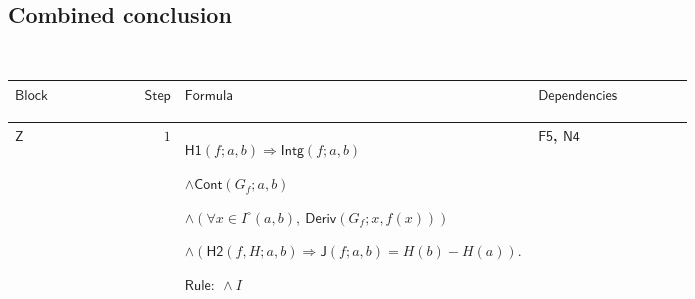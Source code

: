 \documentclass[12pt,reqno]{amsart}
\theoremstyle{blueplain}
\numberwithin{equation}{section}
\newlength{\FTCOneColumnBody}
\begin{document}
{\scriptsize \ }

\subsection{\protect\scriptsize Combined conclusion}

{\scriptsize {\ }}

{\scriptsize \setlength{\parskip}{0pt}\nointerlineskip
\noindent 
\begin{tabular}{|@{}>{\centering\arraybackslash}m{\FTCOneColumnBody}|}
\hline
$\displaystyle \mathsf{Conclusion}$ \\ \hline
\end{tabular}%
}

{\scriptsize \setlength{\parskip}{0pt}\nointerlineskip
\noindent 
\begin{tabular}{|@{}>{\centering\arraybackslash}m{0.10658\linewidth}|>{\centering\arraybackslash}m{0.03553\linewidth}|>{\centering\arraybackslash}m{0.52105\linewidth}|>{\centering\arraybackslash}m{0.23684\linewidth}|}
\hline
$\displaystyle \mathsf{Block}$ & $\displaystyle \mathsf{Step}$ & $%
\displaystyle \mathsf{Formula}$ & $\displaystyle \mathsf{Dependencies}$ \\ 
\hline
\end{tabular}%
}

{\scriptsize \setlength{\parskip}{0pt}\nointerlineskip
\noindent 
\begin{tabular}{|@{}>{\centering\arraybackslash}m{\FTCOneColumnBody}|}
\hline
$\displaystyle \mathsf{Context\_Final}:=$\par$\displaystyle a,b:\mathsf{Real}%
,\quad f,H:\mathsf{RF}.$ \\ \hline
\end{tabular}%
}

{\scriptsize \setlength{\parskip}{0pt}\nointerlineskip
\noindent 
\begin{tabular}{|@{}>{\centering\arraybackslash}m{0.10658\linewidth}|>{\centering\arraybackslash}m{0.03553\linewidth}|>{\centering\arraybackslash}m{0.52105\linewidth}|>{\centering\arraybackslash}m{0.23684\linewidth}|}
\hline
\hypertarget{proof:Z1}{$\displaystyle \mathsf{Z}$} & $\displaystyle 1$ & $%
\displaystyle \mathsf{H1}(f;a,b)\Rightarrow\mathsf{Intg}(f;a,b)$\par$%
\displaystyle \land\mathsf{Cont}(G_f;a,b)$\par$\displaystyle \land(\forall
x\in I^\circ(a,b),\ \mathsf{Deriv}(G_f;x,f(x)))$\par$\displaystyle \land(%
\mathsf{H2}(f,H;a,b)\Rightarrow\mathsf{J}(f;a,b)=H(b)-H(a)).$\par$%
\displaystyle \mathsf{Rule}:\ \land I$ & \hyperlink{proof:F5}{$\displaystyle 
\mathsf{F5}$}, \hyperlink{proof:N4}{$\displaystyle \mathsf{N4}$} \\ \hline
\end{tabular}%
}

{\scriptsize \ }
\end{document}
